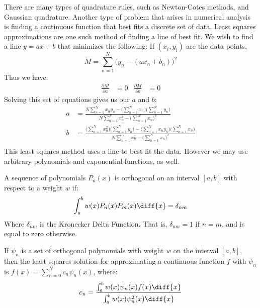         There are many types of quadrature rules, such as
        Newton-Cotes methods, and Gaussian quadrature. Another
        type of problem that arises in numerical analysis is
        finding a continuous function that best fits a
        discrete set of data. Least squares approximations are
        one such method of finding a line of best fit.
        We wish to find a line $y=ax+b$ that minimizes the
        following: If $(x_{i},y_{i})$ are the data points,
        \begin{equation*}
            M=\sum_{n=1}^{N}\big(y_{n}-(ax_{n}+b_{n})\big)^{2}
        \end{equation*}
        Thus we have:
        \begin{align*}
            \frac{\partial{M}}{\partial{a}}&=0
            &
            \frac{\partial{M}}{\partial{b}}&=0
        \end{align*}
        Solving this set of equations gives us
        our $a$ and $b$:
        \begin{align*}
            a&=
            \frac{N\sum_{n=1}^{N}x_{n}y_{n}-
                  \Big(\sum_{n=1}^{N}x_{n}\Big)
                  \Big(\sum_{n=1}^{N}y_{n}\Big)}
                 {N\sum_{n=1}^{N}x_{n}^{2}-
                  \Big(\sum_{n=1}^{N}x_{n}\Big)^{2}}\\
            b&=
            \frac{\Big(\sum_{n=1}^{N}x_{n}^{2}\Big)
                  \Big(\sum_{n=1}^{N}y_{n}\Big)-
                  \Big(\sum_{n=1}^{N}x_{n}y_{n}\Big)
                  \Big(\sum_{n=1}^{N}x_{n}\Big)}
                 {N\sum_{n=1}^{N}x_{n}^{2}-
                  \Big(\sum_{n=1}^{N}x_{n}\Big)^{2}}\\
        \end{align*}
        This least squares method uses a line to best fit
        the data. However we may use arbitrary polynomials
        and exponential functions, as well.
        \begin{definition}
            A sequence of polynomials $P_{n}(x)$ is
            orthogonal on an interval $[a,b]$ with
            respect to a weight $w$ if:
            \begin{equation*}
                \int_{a}^{b}w(x)P_{n}(x)P_{m}(x)\diff{x}
                =\delta_{nm}
            \end{equation*}
            Where $\delta_{nm}$ is the Kronecker Delta Function.
            That is, $\delta_{nm}=1$ if $n=m$, and
            is equal to zero otherwise.
        \end{definition}
        \begin{theorem}
            If $\psi_{n}$ is a set of orthogonal
            polynomials with weight $w$ on the
            interval $[a,b]$, then the least squares
            solution for approximating a continuous
            function $f$ with $\psi_{n}$ is
            $f(x)=\sum_{n=0}^{N}c_{n}\psi_{n}(x)$,
            where:
            \begin{equation*}
                c_{n}=
                \frac{\int_{a}^{b}w(x)\psi_{n}(x)f(x)\diff{x}}
                     {\int_{a}^{b}w(x)\psi_{n}^{2}(x)\diff{x}}
            \end{equation*}
        \end{theorem}